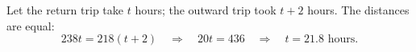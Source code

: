 Let the return trip take $t$ hours; the outward trip took $t+2$ hours. The distances are equal:
\[
238t=218(t+2)\quad\Longrightarrow\quad 20t=436\quad\Longrightarrow\quad t=\boxed{21.8\text{ hours}}.
\]

